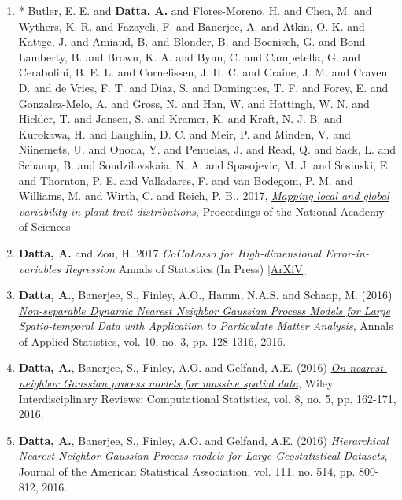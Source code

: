 \documentclass[11pt,a4paper,sans]{moderncv} %
\begin{document}
{\begin{enumerate}
\item \vskip 4mm * Butler, E. E. and \textbf{Datta, A.} and Flores-Moreno, H. and Chen, M. and Wythers, K. R. and Fazayeli, F. and Banerjee, A. and Atkin, O. K. and Kattge, J. and Amiaud, B. and Blonder, B. and Boenisch, G. and Bond-Lamberty, B. and Brown, K. A. and Byun, C. and Campetella, G. and Cerabolini, B. E. L. and Cornelissen, J. H. C. and Craine, J. M. and Craven, D. and de Vries, F. T. and Diaz, S. and Domingues, T. F. and Forey, E. and Gonzalez-Melo, A. and Gross, N. and Han, W. and Hattingh, W. N. and Hickler, T. and Jansen, S. and Kramer, K. and Kraft, N. J. B. and Kurokawa, H. and Laughlin, D. C. and Meir, P. and Minden, V. and Niinemets, U. and Onoda, Y. and Penuelas, J. and Read, Q. and Sack, L. and Schamp, B. and Soudzilovskaia, N. A. and Spasojevic, M. J. and Sosinski, E. and Thornton, P. E. and Valladares, F. and van Bodegom, P. M. and Williams, M. and Wirth, C. and Reich, P. B., 2017, \href{http://www.pnas.org/content/early/2017/11/30/1708984114.abstract}{\em Mapping local and global variability in plant trait distributions}, Proceedings of the National Academy of Sciences

\item \vskip 4mm \textbf{Datta, A.} and Zou, H. 2017 {\em CoCoLasso for High-dimensional Error-in-variables Regression} Annals of Statistics (In Press) \href{https://arxiv.org/pdf/1510.07123v2.pdf}{[ArXiV]}

\item \vskip 4mm \textbf{Datta, A.}, Banerjee, S., Finley, A.O., Hamm, N.A.S. and Schaap, M. (2016) \href{https://projecteuclid.org/euclid.aoas/1475069608}{\em Non-separable Dynamic Nearest Neighbor Gaussian Process Models for Large Spatio-temporal Data with Application to Particulate Matter Analysis}, Annals of Applied Statistics, vol. 10, no. 3, pp. 128-1316, 2016.

\item \vskip 4mm \textbf {Datta, A.}, Banerjee, S., Finley, A.O. and Gelfand, A.E. (2016) \href{http://onlinelibrary.wiley.com/doi/10.1002/wics.1383/abstract}{\em On nearest-neighbor Gaussian process models for massive spatial data}, Wiley Interdisciplinary Reviews: Computational Statistics, vol. 8, no. 5, pp. 162-171, 2016.

\item \vskip 4mm \textbf {Datta, A.}, Banerjee, S., Finley, A.O. and Gelfand, A.E. (2016) \href{http://www.tandfonline.com/doi/abs/10.1080/01621459.2015.1044091}{\em Hierarchical Nearest Neighbor Gaussian Process models for Large Geostatistical Datasets}, Journal of the American Statistical Association, vol. 111, no. 514, pp. 800-812, 2016.


\end{enumerate}}
\end{document}
